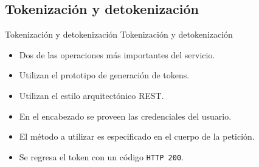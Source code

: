 %
%
%

\subsection{Tokenización y detokenización}

\begin{frame}{Tokenización y detokenización}
  {Tokenización y detokenización}

  \begin{itemize}
    \item Dos de las operaciones más importantes del servicio.
    \item Utilizan el prototipo de generación de tokens.
    \item Utilizan el estilo arquitectónico REST\footnotemark{}.
    \item En el encabezado se proveen las credenciales del usuario.
    \item El método a utilizar es especificado en el cuerpo de la petición.
    \item Se regresa el token con un código \texttt{HTTP 200}.
  \end{itemize}


\end{frame}
